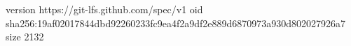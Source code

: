version https://git-lfs.github.com/spec/v1
oid sha256:19af02017844dbd92260233fc9ea4f2a9df2e889d6870973a930d802027926a7
size 2132
